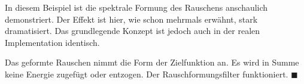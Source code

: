 In diesem Beispiel ist die spektrale Formung des Rauschens anschaulich
demonstriert. Der Effekt ist hier, wie schon mehrmals erwähnt, stark
dramatisiert. Das grundlegende Konzept ist jedoch auch in der realen
Implementation identisch.

Das geformte Rauschen nimmt die Form der Zielfunktion an. Es wird in
Summe keine Energie zugefügt oder entzogen. Der Rauschformungsfilter
funktioniert. \hfill\(\blacksquare\)
